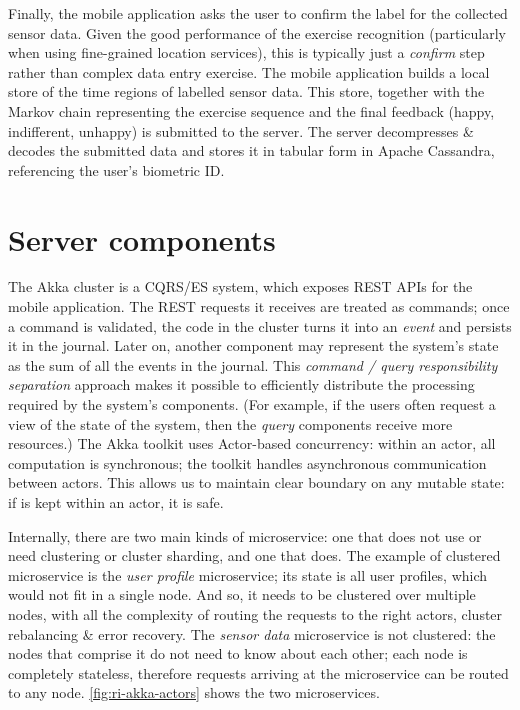 \documentclass[a4paper, 10 pt, conference]{IEEEtran}
\begin{document}
Finally, the mobile application asks the user to confirm the label for the collected sensor data. Given the good performance of the exercise recognition (particularly when using fine-grained location services), this is typically just a \emph{confirm} step rather than complex data entry exercise. The mobile application builds a local store of the time regions of labelled sensor data. This store, together with the Markov chain representing the exercise sequence and the final feedback (happy, indifferent, unhappy) is submitted to the server. The server decompresses \& decodes the submitted data and stores it in tabular form in Apache Cassandra, referencing the user's biometric ID. 

\section{Server components}

The Akka cluster is a CQRS/ES system, which exposes REST APIs for the mobile application. The REST requests it receives are treated as commands; once a command is validated, the code in the cluster turns it into an \emph{event} and persists it in the journal. Later on, another component may represent the system's state as the sum of all the events in the journal. This \emph{command / query responsibility separation} approach makes it possible to efficiently distribute the processing required by the system's components. (For example, if the users often request a view of the state of the system, then the \emph{query} components receive more resources.) The Akka toolkit uses Actor-based concurrency: within an actor, all computation is synchronous; the toolkit handles asynchronous communication between actors. This allows us to maintain clear boundary on any mutable state: if is kept within an actor, it is safe. 

Internally, there are two main kinds of microservice: one that does not use or need clustering or cluster sharding, and one that does. The example of clustered microservice is the \emph{user profile} microservice; its state is all user profiles, which would not fit in a single node. And so, it needs to be clustered over multiple nodes, with all the complexity of routing the requests to the right actors, cluster rebalancing \& error recovery. The \emph{sensor data} microservice is not clustered: the nodes that comprise it do not need to know about each other; each node is completely stateless, therefore requests arriving at the microservice can be routed to any node. \autoref{fig:ri-akka-actors} shows the two microservices.
\end{document}
